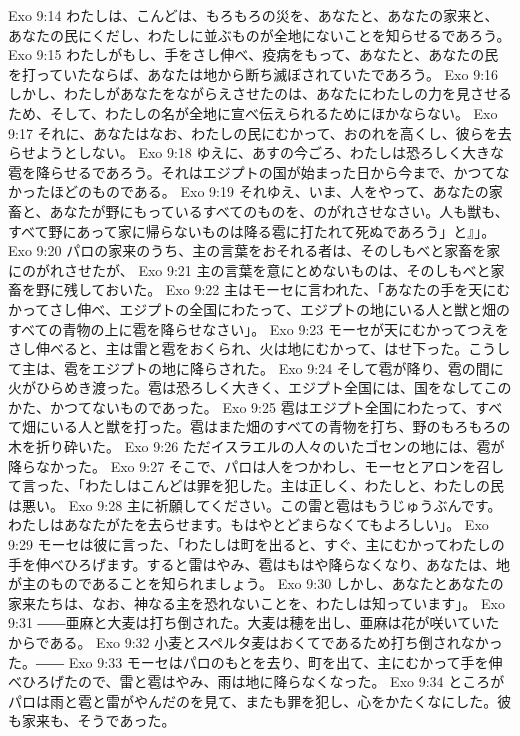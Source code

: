 Exo 9:14  わたしは、こんどは、もろもろの災を、あなたと、あなたの家来と、あなたの民にくだし、わたしに並ぶものが全地にないことを知らせるであろう。
Exo 9:15  わたしがもし、手をさし伸べ、疫病をもって、あなたと、あなたの民を打っていたならば、あなたは地から断ち滅ぼされていたであろう。
Exo 9:16  しかし、わたしがあなたをながらえさせたのは、あなたにわたしの力を見させるため、そして、わたしの名が全地に宣べ伝えられるためにほかならない。
Exo 9:17  それに、あなたはなお、わたしの民にむかって、おのれを高くし、彼らを去らせようとしない。
Exo 9:18  ゆえに、あすの今ごろ、わたしは恐ろしく大きな雹を降らせるであろう。それはエジプトの国が始まった日から今まで、かつてなかったほどのものである。
Exo 9:19  それゆえ、いま、人をやって、あなたの家畜と、あなたが野にもっているすべてのものを、のがれさせなさい。人も獣も、すべて野にあって家に帰らないものは降る雹に打たれて死ぬであろう」と』」。
Exo 9:20  パロの家来のうち、主の言葉をおそれる者は、そのしもべと家畜を家にのがれさせたが、
Exo 9:21  主の言葉を意にとめないものは、そのしもべと家畜を野に残しておいた。
Exo 9:22  主はモーセに言われた、「あなたの手を天にむかってさし伸べ、エジプトの全国にわたって、エジプトの地にいる人と獣と畑のすべての青物の上に雹を降らせなさい」。
Exo 9:23  モーセが天にむかってつえをさし伸べると、主は雷と雹をおくられ、火は地にむかって、はせ下った。こうして主は、雹をエジプトの地に降らされた。
Exo 9:24  そして雹が降り、雹の間に火がひらめき渡った。雹は恐ろしく大きく、エジプト全国には、国をなしてこのかた、かつてないものであった。
Exo 9:25  雹はエジプト全国にわたって、すべて畑にいる人と獣を打った。雹はまた畑のすべての青物を打ち、野のもろもろの木を折り砕いた。
Exo 9:26  ただイスラエルの人々のいたゴセンの地には、雹が降らなかった。
Exo 9:27  そこで、パロは人をつかわし、モーセとアロンを召して言った、「わたしはこんどは罪を犯した。主は正しく、わたしと、わたしの民は悪い。
Exo 9:28  主に祈願してください。この雷と雹はもうじゅうぶんです。わたしはあなたがたを去らせます。もはやとどまらなくてもよろしい」。
Exo 9:29  モーセは彼に言った、「わたしは町を出ると、すぐ、主にむかってわたしの手を伸べひろげます。すると雷はやみ、雹はもはや降らなくなり、あなたは、地が主のものであることを知られましょう。
Exo 9:30  しかし、あなたとあなたの家来たちは、なお、神なる主を恐れないことを、わたしは知っています」。
Exo 9:31  ――亜麻と大麦は打ち倒された。大麦は穂を出し、亜麻は花が咲いていたからである。
Exo 9:32  小麦とスペルタ麦はおくてであるため打ち倒されなかった。――
Exo 9:33  モーセはパロのもとを去り、町を出て、主にむかって手を伸べひろげたので、雷と雹はやみ、雨は地に降らなくなった。
Exo 9:34  ところがパロは雨と雹と雷がやんだのを見て、またも罪を犯し、心をかたくなにした。彼も家来も、そうであった。
